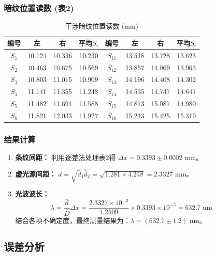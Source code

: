 \documentclass[]{../template/Report}%
\begin{document}
\begin{fullreportonly}
\subsubsection{暗纹位置读数 (表2)}
\begin{table}[H]
\centering
\caption{干涉暗纹位置读数 (mm)}
\begin{tabular}{cccc|cccc}
\toprule
编号 & 左 & 右 & 平均$S_i$ & 编号 & 左 & 右 & 平均$S_i$ \\
\midrule
$S_1$ & 10.124 & 10.336 & 10.230 & $S_{11}$ & 13.518 & 13.728 & 13.623 \\
$S_2$ & 10.463 & 10.675 & 10.569 & $S_{12}$ & 13.857 & 14.069 & 13.963 \\
$S_3$ & 10.803 & 11.015 & 10.909 & $S_{13}$ & 14.196 & 14.408 & 14.302 \\
$S_4$ & 11.141 & 11.355 & 11.248 & $S_{14}$ & 14.535 & 14.747 & 14.641 \\
$S_5$ & 11.482 & 11.694 & 11.588 & $S_{15}$ & 14.873 & 15.087 & 14.980 \\
$S_6$ & 11.821 & 12.033 & 11.927 & $S_{16}$ & 15.213 & 15.425 & 15.319 \\
\bottomrule
\end{tabular}
\end{table}

\subsubsection{结果计算}
\begin{enumerate}
    \item \textbf{条纹间距：} 利用逐差法处理表2得 $\Delta x = 0.3393 \pm 0.0002$ mm。
    \item \textbf{虚光源间距：} $d = \sqrt{\bar{d}_1 \bar{d}_2} = \sqrt{1.281 \times 4.248} = 2.3327$ mm。
    \item \textbf{光波波长：}
    \[ \bar{\lambda} = \frac{\bar{d}}{\bar{D}} \Delta x = \frac{2.3327 \times 10^{-3}}{1.2509} \times 0.3393 \times 10^{-3} = 632.7 \text{ nm} \]
    结合各项不确定度，最终测量结果为：$\lambda = (632.7 \pm 1.2)$ nm。
\end{enumerate}


\subsection{误差分析}


\end{fullreportonly}
\end{document}
